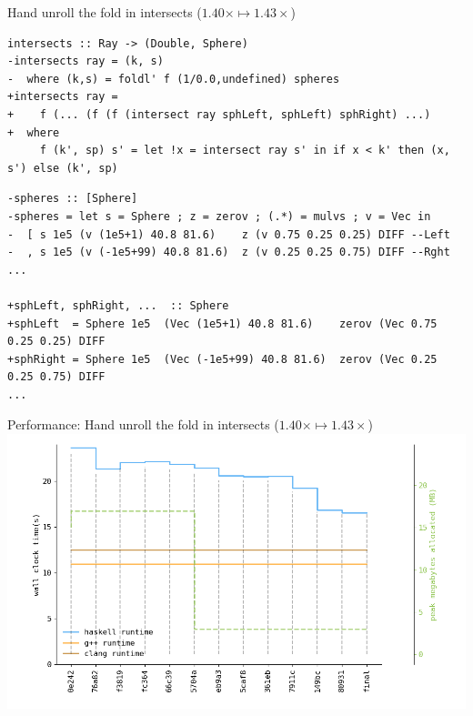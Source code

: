 \documentclass[8pt]{beamer}
\begin{document}
\begin{frame}[fragile]{Hand unroll the fold in intersects ($1.40\times \mapsto 1.43\times$)}

\begin{verbatim}
intersects :: Ray -> (Double, Sphere)
-intersects ray = (k, s)
-  where (k,s) = foldl' f (1/0.0,undefined) spheres
+intersects ray =
+    f (... (f (f (intersect ray sphLeft, sphLeft) sphRight) ...)
+  where
     f (k', sp) s' = let !x = intersect ray s' in if x < k' then (x, s') else (k', sp)
\end{verbatim}


\begin{verbatim}
-spheres :: [Sphere]
-spheres = let s = Sphere ; z = zerov ; (.*) = mulvs ; v = Vec in
-  [ s 1e5 (v (1e5+1) 40.8 81.6)    z (v 0.75 0.25 0.25) DIFF --Left
-  , s 1e5 (v (-1e5+99) 40.8 81.6)  z (v 0.25 0.25 0.75) DIFF --Rght
...

+sphLeft, sphRight, ...  :: Sphere
+sphLeft  = Sphere 1e5  (Vec (1e5+1) 40.8 81.6)    zerov (Vec 0.75 0.25 0.25) DIFF
+sphRight = Sphere 1e5  (Vec (-1e5+99) 40.8 81.6)  zerov (Vec 0.25 0.25 0.75) DIFF
...
\end{verbatim}

\end{frame}

\begin{frame}[fragile]{Performance: Hand unroll the fold in intersects ($1.40\times \mapsto  1.43\times$)}
\includegraphics[height=0.6\textwidth]{perfdata-upto-80931-gen.png}
\end{frame}
\end{document}
